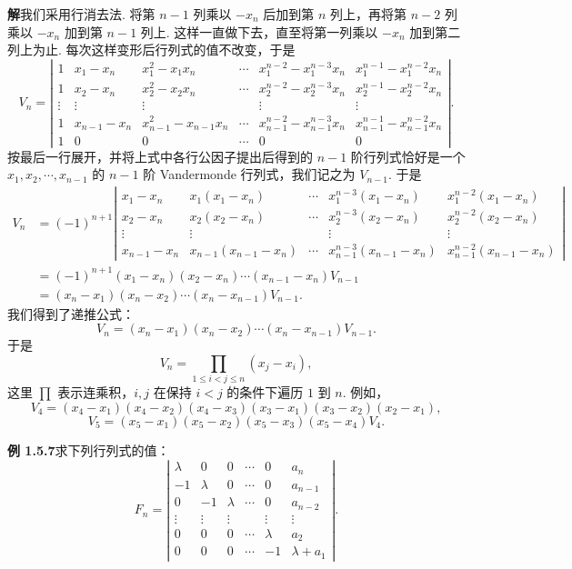 \documentclass[UTF8,12pt,a4paper,fontset=fandol]{ctexart}
\begin{document}
\noindent\textbf{解}\quad 我们采用行消去法. 将第 $n-1$ 列乘以 $-x_n$ 后加到第 $n$ 列上，再将第 $n-2$ 列乘以 $-x_n$ 加到第 $n-1$ 列上. 这样一直做下去，直至将第一列乘以 $-x_n$ 加到第二列上为止. 每次这样变形后行列式的值不改变，于是
\[
V_n=
\left|\begin{array}{cccccc}
1 & x_1-x_n & x_1^2-x_1x_n & \cdots & x_1^{n-2}-x_1^{n-3}x_n & x_1^{n-1}-x_1^{n-2}x_n\\
1 & x_2-x_n & x_2^2-x_2x_n & \cdots & x_2^{n-2}-x_2^{n-3}x_n & x_2^{n-1}-x_2^{n-2}x_n\\
\vdots & \vdots & \vdots & & \vdots & \vdots\\
1 & x_{n-1}-x_n & x_{n-1}^2-x_{n-1}x_n & \cdots & x_{n-1}^{n-2}-x_{n-1}^{n-3}x_n & x_{n-1}^{n-1}-x_{n-1}^{n-2}x_n\\
1 & 0 & 0 & \cdots & 0 & 0
\end{array}\right|.
\]
按最后一行展开，并将上式中各行公因子提出后得到的 $n-1$ 阶行列式恰好是一个 $x_1,x_2,\cdots,x_{n-1}$ 的 $n-1$ 阶 Vandermonde 行列式，我们记之为 $V_{n-1}$. 于是
\[
\begin{aligned}
V_n
&=(-1)^{n+1}
\left|\begin{array}{ccccc}
x_1-x_n & x_1(x_1-x_n) & \cdots & x_1^{n-3}(x_1-x_n) & x_1^{n-2}(x_1-x_n)\\
x_2-x_n & x_2(x_2-x_n) & \cdots & x_2^{n-3}(x_2-x_n) & x_2^{n-2}(x_2-x_n)\\
\vdots & \vdots & & \vdots & \vdots\\
x_{n-1}-x_n & x_{n-1}(x_{n-1}-x_n) & \cdots & x_{n-1}^{n-3}(x_{n-1}-x_n) & x_{n-1}^{n-2}(x_{n-1}-x_n)
\end{array}\right|\\
&=(-1)^{n+1}(x_1-x_n)(x_2-x_n)\cdots(x_{n-1}-x_n)V_{n-1}\\
&=(x_n-x_1)(x_n-x_2)\cdots(x_n-x_{n-1})V_{n-1}.
\end{aligned}
\]
我们得到了递推公式：
\[
V_n=(x_n-x_1)(x_n-x_2)\cdots(x_n-x_{n-1})V_{n-1}.
\]
于是
\[
V_n=\prod_{1\le i<j\le n}(x_j-x_i),
\]
这里 $\prod$ 表示连乘积，$i,j$ 在保持 $i<j$ 的条件下遍历 $1$ 到 $n$. 例如，
\[
V_4=(x_4-x_1)(x_4-x_2)(x_4-x_3)(x_3-x_1)(x_3-x_2)(x_2-x_1),
\]
\[
V_5=(x_5-x_1)(x_5-x_2)(x_5-x_3)(x_5-x_4)V_4.
\]

\noindent\textbf{例 1.5.7}\quad 求下列行列式的值：
\[
F_n=
\left|\begin{array}{cccccc}
\lambda & 0 & 0 & \cdots & 0 & a_n\\
-1 & \lambda & 0 & \cdots & 0 & a_{n-1}\\
0 & -1 & \lambda & \cdots & 0 & a_{n-2}\\
\vdots & \vdots & \vdots & & \vdots & \vdots\\
0 & 0 & 0 & \cdots & \lambda & a_2\\
0 & 0 & 0 & \cdots & -1 & \lambda+a_1
\end{array}\right|.
\]
\end{document}
